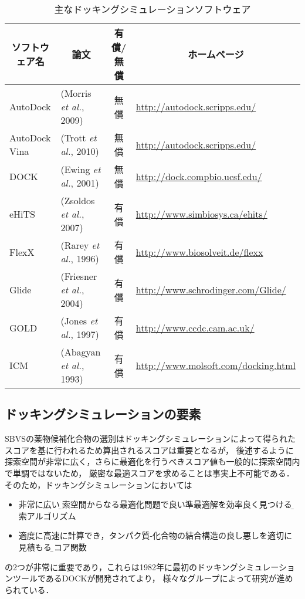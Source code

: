 \begin{table}[htb] \centering
	\caption{主なドッキングシミュレーションソフトウェア}
	\label{table:docking_tools_eg}
	\begin{tabular}{llcl}
	\hline
	\multicolumn{1}{c}{ソフトウェア名}	&\multicolumn{1}{c}{論文}			&\multicolumn{1}{c}{有償/無償}	&\multicolumn{1}{c}{ホームページ}	\\ \hline
	AutoDock					&(Morris {\it et al.}, 2009)\cite{Morris2009}												&無償									&\url{http://autodock.scripps.edu/}	\\ 
	AutoDock Vina				&(Trott  {\it et al.}, 2010)\cite{Trott2010}																											&無償									&\url{http://autodock.scripps.edu/}	\\ 
	DOCK							&(Ewing {\it et al.}, 2001)\cite{Ewing2001}																				&無償									&\url{http://dock.compbio.ucsf.edu/}	\\
	eHiTS							&(Zsoldos {\it et al.}, 2007)\cite{Zsoldos2007}											&有償									&\url{http://www.simbiosys.ca/ehits/}	\\
	FlexX							&(Rarey {\it et al.}, 1996)\cite{Rarey1996}																											&有償									&\url{http://www.biosolveit.de/flexx}	\\
	Glide							&(Friesner {\it et al.}, 2004)\cite{Friesner2004}													&有償									&\url{http://www.schrodinger.com/Glide/}	\\
	GOLD							&(Jones {\it et al.}, 1997)\cite{Jones1997}																				&有償									&\url{http://www.ccdc.cam.ac.uk/}	\\
	ICM								&(Abagyan {\it et al.}, 1993)\cite{Abagyan1993}																											&有償									&\url{http://www.molsoft.com/docking.html}	\\ \hline
	\end{tabular}
\end{table}


\subsection{ドッキングシミュレーションの要素}\label{subsec:docking_elements}
SBVSの薬物候補化合物の選別はドッキングシミュレーションによって得られたスコアを基に行われるため算出されるスコアは重要となるが，
後述するように探索空間が非常に広く，さらに最適化を行うべきスコア値も一般的に探索空間内で単調ではないため，
厳密な最適スコアを求めることは事実上不可能である．そのため，ドッキングシミュレーションにおいては
\begin{itemize}
\item 非常に広い\b{探索空間}からなる最適化問題で良い準最適解を効率良く見つける\b{探索アルゴリズム}
\item 適度に高速に計算でき，タンパク質-化合物の結合構造の良し悪しを適切に見積もる\b{スコア関数}
\end{itemize}
の2つが非常に重要であり，これらは1982年に最初のドッキングシミュレーションツールであるDOCK\cite{Kuntz1982}が開発されてより，
様々なグループによって研究が進められている．

